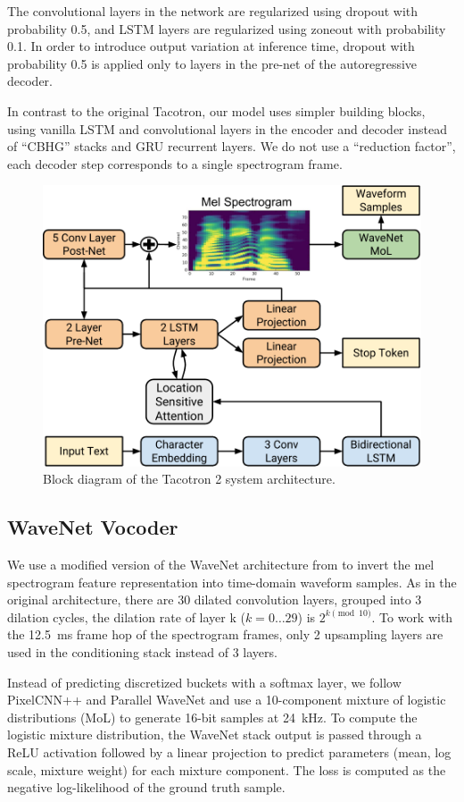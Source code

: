 The convolutional layers in the network are regularized using dropout
\cite{srivastava2014dropout} with probability 0.5, and LSTM layers are
regularized using zoneout \cite{krueger2016zoneout} with probability 0.1. In
order to introduce output variation at inference time, dropout with probability
0.5 is applied only to layers in the pre-net of the autoregressive decoder.

In contrast to the original Tacotron, our model uses simpler
building blocks, using vanilla LSTM and convolutional layers in
the encoder and decoder instead of ``CBHG'' stacks and GRU recurrent
layers.
%
We do not use a ``reduction factor'', \ie each decoder step
corresponds to a single spectrogram frame.


\begin{figure}[t!]
\centering
\includegraphics[width=0.98\columnwidth]{TTSArchitecture.pdf}
\caption{Block diagram of the Tacotron 2 system architecture.}
\label{fig:TTSArchitecture}
\end{figure}


\subsection{WaveNet Vocoder}
\label{ssec:wavenet}

We use a modified version of the WaveNet architecture from \cite{45774} to
invert the mel spectrogram feature representation into time-domain waveform
samples.
%
As in the original architecture, there are 30 dilated convolution layers,
grouped into 3 dilation cycles, \ie the dilation rate of layer k
($k=0\ldots 29$) is $2^{k\pmod{10}}$.
%
To work with the 12.5~ms frame hop of the spectrogram frames, only 2 upsampling
layers are used in the conditioning stack instead of 3 layers.

Instead of predicting discretized buckets with a softmax layer,
we follow PixelCNN++ \cite{DBLP:journals/corr/SalimansKCK17} and
Parallel WaveNet \cite{FasterWaveNet} and use a 10-component
mixture of logistic distributions (MoL) to generate 16-bit samples at 24~kHz.
%
To compute the logistic mixture distribution, the WaveNet stack output is passed
through a ReLU activation followed by a linear projection to predict
parameters (mean, log scale, mixture weight) for each mixture component.
%
The loss is computed as the negative log-likelihood of the ground truth sample.
